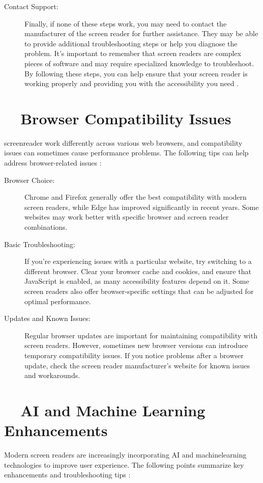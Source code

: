 \begin{description}
	\item[Contact Support:] Finally, if none of these steps work, you may need to contact the manufacturer of the screen reader for further assistance. They may be able to provide additional troubleshooting steps or help you diagnose the problem. It's important to remember that screen readers are complex pieces of software and may require specialized knowledge to troubleshoot. By following these steps, you can help ensure that your screen reader is working properly and providing you with the accessibility you need \cite{FreedomScientificJAWS, NVAccess, MicrosoftAccessibility}.
\end{description}

\section{~~Browser Compatibility Issues}
\label{app1:browser}
\gls{screenreader} work differently across various web browsers, and compatibility issues can sometimes cause performance problems. The following tips can help address browser-related issues \cite{WebAIMSurvey}:

\begin{description}
	\item[Browser Choice:] Chrome and Firefox generally offer the best compatibility with modern screen readers, while Edge has improved significantly in recent years. Some websites may work better with specific browser and screen reader combinations.
	\item[Basic Troubleshooting:] If you're experiencing issues with a particular website, try switching to a different browser. Clear your browser cache and cookies, and ensure that JavaScript is enabled, as many accessibility features depend on it. Some screen readers also offer browser-specific settings that can be adjusted for optimal performance.
	\item[Updates and Known Issues:] Regular browser updates are important for maintaining compatibility with screen readers. However, sometimes new browser versions can introduce temporary compatibility issues. If you notice problems after a browser update, check the screen reader manufacturer's website for known issues and workarounds.
\end{description}

\section{~~AI and Machine Learning Enhancements}
\label{app1:ai}
Modern screen readers are increasingly incorporating \gls{AI} and \gls{machinelearning} technologies to improve user experience. The following points summarize key enhancements and \gls{troubleshooting} tips \cite{MicrosoftAIAccessibility, Kim2023}:

